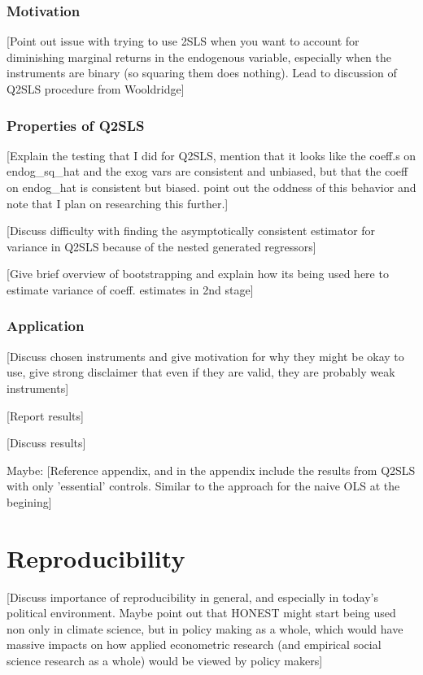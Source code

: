 \documentclass[12pt]{article}
\begin{document}
\subsubsection{Motivation}
\textcolor{BrickRed}{[Point out issue with trying to use 2SLS when you want to account for diminishing marginal returns in the endogenous variable, especially when the instruments are binary (so squaring them does nothing). Lead to discussion of Q2SLS procedure from Wooldridge]}

\subsubsection{Properties of Q2SLS}
\textcolor{BrickRed}{[Explain the testing that I did for Q2SLS, mention that it looks like the coeff.s on endog\_sq\_hat and the exog vars are consistent and unbiased, but that the coeff on endog\_hat is consistent but biased. point out the oddness of this behavior and note that I plan on researching this further.]}

\textcolor{BrickRed}{[Discuss difficulty with finding the asymptotically consistent estimator for variance in Q2SLS because of the nested generated regressors]}

\textcolor{BrickRed}{[Give brief overview of bootstrapping and explain how its being used here to estimate variance of coeff. estimates in 2nd stage]}

\subsubsection{Application}
\textcolor{BrickRed}{[Discuss chosen instruments and give motivation for why they might be okay to use, give strong disclaimer that even if they are valid, they are probably weak instruments]}

\textcolor{BrickRed}{[Report results]}

\textcolor{BrickRed}{[Discuss results]}

Maybe: \textcolor{BrickRed}{[Reference appendix, and in the appendix include the results from Q2SLS with only 'essential' controls. Similar to the approach for the naive OLS at the begining]}


\newpage
\section{Reproducibility}
\textcolor{BrickRed}{[Discuss importance of reproducibility in general, and especially in today's political environment. Maybe point out that HONEST might start being used non only in climate science, but in policy making as a whole, which would have massive impacts on how applied econometric research (and empirical social science research as a whole) would be viewed by policy makers]}
\end{document}
